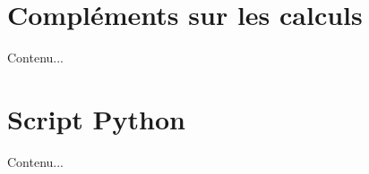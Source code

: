 \begin{appendices}
\chapter{Compléments sur les calculs}
Contenu...

\chapter{Script Python}
Contenu...
\end{appendices}